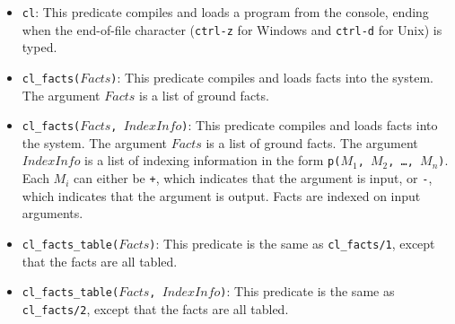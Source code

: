 \begin{itemize}
\item \texttt{cl}: This predicate compiles and loads a program from the console, ending when the end-of-file character ({\tt ctrl-z} for Windows and {\tt ctrl-d} for Unix) is typed.


\item \texttt{cl\_facts($Facts$)}: This predicate compiles and loads facts into the system.  The argument $Facts$ is a list of ground facts.

\item \texttt{cl\_facts($Facts$, $IndexInfo$)}: This predicate compiles and loads facts into the system.  The argument $Facts$ is a list of ground facts.  The argument $IndexInfo$ is a list of indexing information in the form \texttt{p($M_1$, $M_2$, \ldots, $M_n$)}.  Each $M_i$ can either be \texttt{+}, which indicates that the argument is input, or \texttt{-}, which indicates that the argument is output. Facts are indexed on input arguments.

\item \texttt{cl\_facts\_table($Facts$)}: This predicate is the same as \texttt{cl\_facts/1}, except that the facts are all tabled.

\item \texttt{cl\_facts\_table($Facts$, $IndexInfo$)}: This predicate is the same as \texttt{cl\_facts/2}, except that the facts are all tabled.
\end{itemize}

